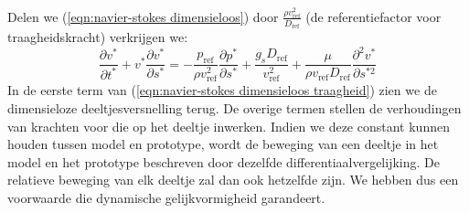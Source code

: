 Delen we (\ref{eqn:navier-stokes dimensieloos}) door $\frac{\rho v_{\text{ref}}^2}{D_{\text{ref}}}$ (de referentiefactor voor traagheidskracht) verkrijgen we:
\begin{equation}
	\frac{\partial v^*}{\partial t^*} + v^* \frac{\partial v^*}{\partial s^*} =- \frac{p_{\text{ref}}}{\rho v_{\text{ref}}^2} \frac{\partial p^*}{\partial s^*} + \frac{g_s D_{\text{ref}}}{v_{\text{ref}}^2} + \frac{\mu}{\rho v_{\text{ref}} D_{\text{ref}}} \frac{\partial^2 v^*}{\partial s^{*2}}
	\label{eqn:navier-stokes dimensieloos traagheid}
\end{equation}
In de eerste term van (\ref{eqn:navier-stokes dimensieloos traagheid}) zien we de dimensieloze deeltjesversnelling terug. De overige termen stellen de verhoudingen van krachten voor die op het deeltje inwerken. Indien we deze constant kunnen houden tussen model en prototype, wordt de beweging van een deeltje in het model en het prototype beschreven door dezelfde differentiaalvergelijking. De relatieve beweging van elk deeltje zal dan ook hetzelfde zijn. We hebben dus een voorwaarde die dynamische gelijkvormigheid garandeert.


